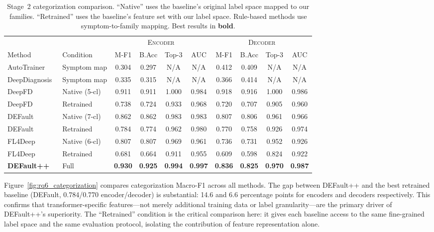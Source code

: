 \begin{table}[!ht]
\centering
\caption{Stage~2 categorization comparison. ``Native'' uses the baseline's original label space mapped to our families. ``Retrained'' uses the baseline's feature set with our label space. Rule-based methods use symptom-to-family mapping. Best results in \textbf{bold}.}
\label{tab:baseline_categorization}
\small
\setlength{\tabcolsep}{3pt}
\begin{tabular}{l l cccc cccc}
\toprule
& & \multicolumn{4}{c}{\textsc{Encoder}} & \multicolumn{4}{c}{\textsc{Decoder}} \\
\cmidrule(lr){3-6}\cmidrule(lr){7-10}
Method & Condition & M-F1 & B.Acc & Top-3 & AUC & M-F1 & B.Acc & Top-3 & AUC \\
\midrule
AutoTrainer~\cite{autotrainer}     & Symptom map   & 0.304  & 0.297  & N/A  & N/A  & 0.412  & 0.409  & N/A  & N/A \\
DeepDiagnosis~\cite{deepdiagnosis} & Symptom map   & 0.335  & 0.315  & N/A  & N/A  & 0.366  & 0.414  & N/A  & N/A \\
\addlinespace
DeepFD~\cite{deepfd}          & Native (5-cl) & 0.911  & 0.911  & 1.000  & 0.984  & 0.918  & 0.916  & 1.000  & 0.986 \\
DeepFD~\cite{deepfd}          & Retrained     & 0.738  & 0.724  & 0.933  & 0.968  & 0.720  & 0.707  & 0.905  & 0.960 \\
\addlinespace
DEFault~\cite{default}         & Native (7-cl) & 0.862  & 0.862  & 0.983  & 0.983  & 0.807  & 0.806  & 0.961  & 0.966 \\
DEFault~\cite{default}         & Retrained     & 0.784  & 0.774  & 0.962  & 0.980  & 0.770  & 0.758  & 0.926  & 0.974 \\
\addlinespace
FL4Deep~\cite{fl4deep}         & Native (6-cl) & 0.807  & 0.807  & 0.969  & 0.961  & 0.736  & 0.731  & 0.952  & 0.926 \\
FL4Deep~\cite{fl4deep}         & Retrained     & 0.681  & 0.664  & 0.911  & 0.955  & 0.609  & 0.598  & 0.824  & 0.922 \\
\midrule
\textbf{DEFault++} & Full & \textbf{0.930} & \textbf{0.925} & \textbf{0.994} & \textbf{0.997} & \textbf{0.836} & \textbf{0.825} & \textbf{0.970} & \textbf{0.987} \\
\bottomrule
\end{tabular}
\end{table}

Figure~\ref{fig:rq6_categorization} compares categorization Macro-F1 across all methods. The gap between DEFault++ and the best retrained baseline (DEFault, 0.784/0.770 encoder/decoder) is substantial: 14.6 and 6.6 percentage points for encoders and decoders respectively. This confirms that transformer-specific features---not merely additional training data or label granularity---are the primary driver of DEFault++'s superiority. The ``Retrained'' condition is the critical comparison here: it gives each baseline access to the same fine-grained label space and the same evaluation protocol, isolating the contribution of feature representation alone.

